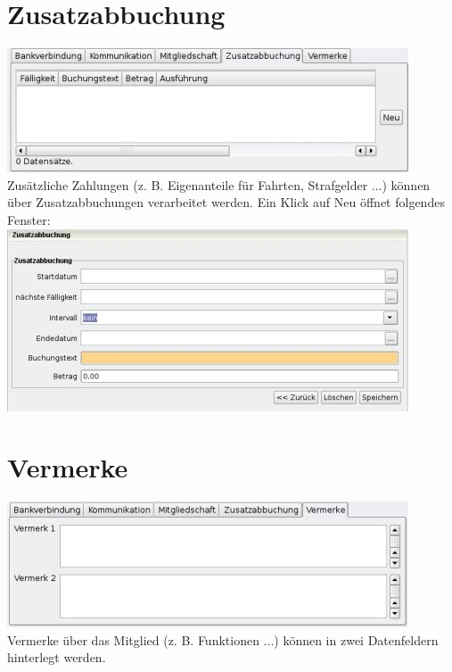 \documentclass[a4paper,BCOR30mm,DIV14,pdftex,liststotoc,footsepline,openany]{scrbook}
\begin{document}
\section{Zusatzabbuchung}
\includegraphics{./screenshots/mitgliedzusatzabbuchung.jpg}\\
Zusätzliche Zahlungen (z. B. Eigenanteile für Fahrten, Strafgelder ...) können über Zusatzabbuchungen verarbeitet werden. Ein Klick auf Neu öffnet folgendes Fenster:\\
\includegraphics{./screenshots/zusatzabbuchung.jpg}\\

\section{Vermerke}
\includegraphics{./screenshots/mitgliedvermerke.jpg}\\
Vermerke über das Mitglied (z. B. Funktionen ...) können in zwei Datenfeldern hinterlegt werden.
\end{document}
